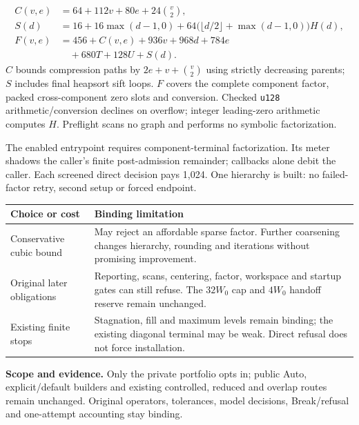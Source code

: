 \documentclass[11pt,letterpaper]{article}
\renewcommand{\arraystretch}{1.16}
\newcommand{\smallbody}{\fontsize{9.4}{11.65}\selectfont\color{Ink}\RaggedRight}
\newcommand{\tinybody}{\fontsize{8.6}{10.6}\selectfont\color{Ink}\RaggedRight}
\newenvironment{compactleaf}{\setlength{\parskip}{2.5pt}\renewcommand{\arraystretch}{1.06}\renewcommand{\smallbody}{\fontsize{9.2}{11.1}\selectfont\color{Ink}\RaggedRight}\renewcommand{\sub}[1]{\par\vspace{2pt}{\sffamily\bfseries\fontsize{11.5}{14}\selectfont\color{Teal}##1\par}}\renewcommand{\tagline}[1]{{\sffamily\fontsize{9.5}{12}\selectfont\color{Muted}##1\par}\vspace{3pt}}}{}
\newcommand{\sub}[1]{\par\vspace{4pt}{\sffamily\bfseries\fontsize{11.5}{14}\selectfont\color{Teal}#1\par}\vspace{1pt}}
\newcommand{\tagline}[1]{{\sffamily\fontsize{9.5}{12}\selectfont\color{Muted}#1\par}\vspace{5pt}}
\newcommand{\code}[1]{\texttt{#1}}
\begin{document}
\begin{compactleaf}
\[
\begin{aligned}
 C(v,e)&=64+112v+80e+24\binom v2,\\
 S(d)&=16+16\max(d-1,0)+64\bigl(\lfloor d/2\rfloor+\max(d-1,0)\bigr)H(d),\\
 F(v,e)&=456+C(v,e)+936v+968d+784e\\
       &\quad+680T+128U+S(d).
\end{aligned}
\]
$C$ bounds compression paths by $2e+v+\binom v2$ using strictly decreasing parents; $S$ includes final heapsort sift loops. $F$ covers the complete component factor, packed cross-component zero slots and conversion. Checked \code{u128} arithmetic/conversion declines on overflow; integer leading-zero arithmetic computes $H$. Preflight scans no graph and performs no symbolic factorization.

\sub{Resources, scope and tradeoffs}
The enabled entrypoint requires component-terminal factorization. Its meter shadows the caller's finite post-admission remainder; callbacks alone debit the caller. Each screened direct decision pays 1,024. One hierarchy is built: no failed-factor retry, second setup or forced endpoint.

\begin{tabularx}{\linewidth}{P{.25\linewidth}Y}
\toprule
\textbf{Choice or cost} & \textbf{Binding limitation}\\
\midrule
Conservative cubic bound & May reject an affordable sparse factor. Further coarsening changes hierarchy, rounding and iterations without promising improvement.\\
Original later obligations & Reporting, scans, centering, factor, workspace and startup gates can still refuse. The $32W_0$ cap and $4W_0$ handoff reserve remain unchanged.\\
Existing finite stops & Stagnation, fill and maximum levels remain binding; the existing diagonal terminal may be weak. Direct refusal does not force installation.\\
\bottomrule
\end{tabularx}
\begin{binding}\tinybody
\textbf{Scope and evidence.} Only the private portfolio opts in; public Auto, explicit/default builders and existing controlled, reduced and overlap routes remain unchanged. Original operators, tolerances, model decisions, Break/refusal and one-attempt accounting stay binding.


\end{binding}
\end{compactleaf}
\end{document}
